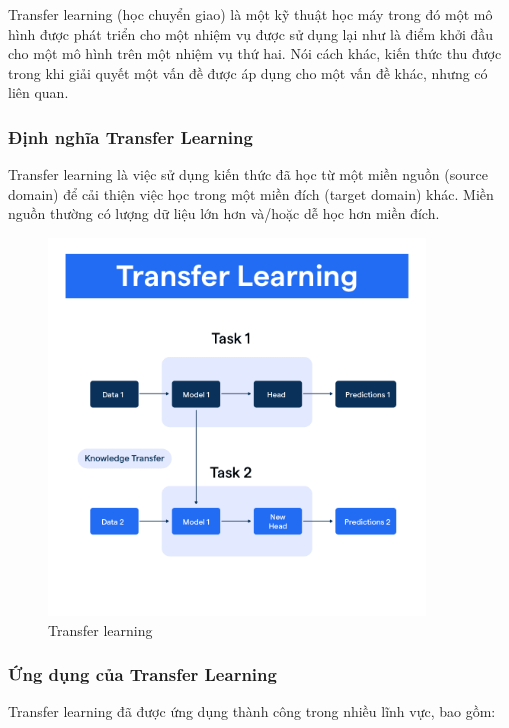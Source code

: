 Transfer learning (học chuyển giao) là một kỹ thuật học máy trong đó một mô hình được phát triển cho một nhiệm vụ được sử dụng lại như là điểm khởi đầu cho một mô hình trên một nhiệm vụ thứ hai. Nói cách khác, kiến thức thu được trong khi giải quyết một vấn đề được áp dụng cho một vấn đề khác, nhưng có liên quan. 

\subsubsection{Định nghĩa Transfer Learning}

Transfer learning là việc sử dụng kiến thức đã học từ một miền nguồn (source domain) để cải thiện việc học trong một miền đích (target domain) khác. Miền nguồn thường có lượng dữ liệu lớn hơn và/hoặc dễ học hơn miền đích. 

 \begin{figure}[H]
    \centering
    \includegraphics[width=10cm]{Images/Theoretical basis/Transfer_Learning.png}
\caption{Transfer learning}
\end{figure}


\subsubsection{Ứng dụng của Transfer Learning}

Transfer learning đã được ứng dụng thành công trong nhiều lĩnh vực, bao gồm:

